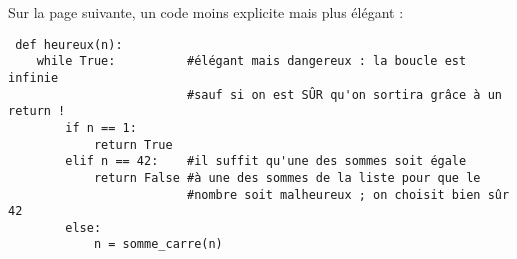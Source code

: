 \begin{enumerate}
Sur la page suivante, un code moins explicite mais plus élégant :
\newpage

\begin{verbatim}
 def heureux(n):
    while True:          #élégant mais dangereux : la boucle est infinie
                         #sauf si on est SÛR qu'on sortira grâce à un return !
        if n == 1:
            return True
        elif n == 42:    #il suffit qu'une des sommes soit égale
            return False #à une des sommes de la liste pour que le
                         #nombre soit malheureux ; on choisit bien sûr 42
        else:
            n = somme_carre(n)
\end{verbatim}
\end{enumerate}


